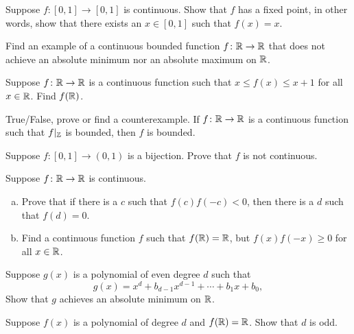 \begin{exercise}
Suppose $f \colon [0,1] \to [0,1]$ is continuous.  Show that $f$
has a fixed point, in other words, show that there exists an $x \in [0,1]$ such that
$f(x) = x$.
\end{exercise}

\begin{exercise}
Find an example of a continuous bounded function $f \colon {\mathbb{R}} \to {\mathbb{R}}$ that does
not achieve an absolute minimum nor an absolute maximum on ${\mathbb{R}}$.
\end{exercise}

\begin{exercise}
Suppose $f \colon {\mathbb{R}} \to {\mathbb{R}}$ is a continuous function such that
$x \leq f(x) \leq x+1$ for all $x \in {\mathbb{R}}$.  Find $f({\mathbb{R}})$.
\end{exercise}

\begin{exercise}
True/False, prove or find a counterexample.  If $f \colon {\mathbb{R}} \to
{\mathbb{R}}$ is a continuous function such that $f|_{{\mathbb{Z}}}$ is bounded, then $f$
is bounded.
\end{exercise}

\begin{exercise}
Suppose $f \colon [0,1] \to (0,1)$ is a bijection.  Prove that $f$ is not
continuous.
\end{exercise}

\begin{exercise}
Suppose $f \colon {\mathbb{R}} \to {\mathbb{R}}$ is continuous.
\begin{enumerate}[a)]
\item
Prove that if there is a $c$ such that $f(c)f(-c) < 0$,
then there is a $d$ such that $f(d) = 0$.
\item
Find a continuous function $f$ such that
$f({\mathbb{R}}) = {\mathbb{R}}$, but $f(x)f(-x) \geq 0$ for all $x \in {\mathbb{R}}$.
\end{enumerate}
\end{exercise}

\begin{exercise}
Suppose $g(x)$ is a polynomial of even degree $d$ such that
\begin{equation*}
g(x) = x^d + b_{d-1} x^{d-1} + \cdots + b_1 x + b_0 ,
\end{equation*}
Show that $g$ achieves an absolute minimum on ${\mathbb{R}}$.
\end{exercise}

\begin{exercise}
Suppose $f(x)$ is a polynomial of degree $d$ and 
$f({\mathbb{R}}) = {\mathbb{R}}$.  Show that $d$ is odd.
\end{exercise}

